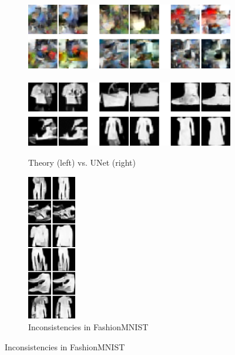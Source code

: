 \documentclass{article}
\theoremstyle{plain}
\theoremstyle{definition}
\theoremstyle{remark}
\begin{document}
\begin{figure}[t]
\begin{subfigure}[t]{0.335\textwidth}
    \includegraphics[width=\linewidth]{cifar10_zeros_samps_unet_small.png}\\\\
    \includegraphics[width=\linewidth]
    {fashion_mnist_zeros_samps_unet_small.png}
    \caption{Theory (left) vs. UNet (right)}
    \end{subfigure}%
        \hspace{10mm}
    \begin{subfigure}[t]{0.15\textwidth}
    \includegraphics[height=6.37cm,valign=t]{fashion_mnist_inconsistent2.png}
    \caption{Inconsistencies in FashionMNIST}
    \label{fig:inconsistencies}
    \end{subfigure} 
    \vspace{-1em}

\end{figure}
\end{document}

